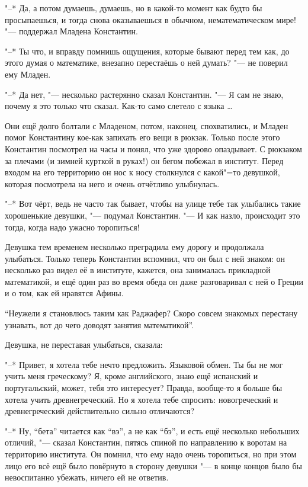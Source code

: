 "--* Да, а потом думаешь, думаешь, но в какой-то момент как будто бы
просыпаешься, и тогда снова оказываешься в обычном, нематематическом мире!
"--- поддержал Младена Константин.

"--* Ты что, и вправду помнишь ощущения, которые бывают перед тем как, до этого
думая о математике, внезапно перестаёшь о ней думать? "--- не поверил ему Младен.

"--* Да нет, "--- несколько растерянно сказал Константин.
"--- Я сам не знаю, почему я это только что сказал.
Как-то само слетело с языка \ldots

Они ещё долго болтали с Младеном, потом, наконец, спохватились, и Младен помог
Константину кое-как запихать его вещи в рюкзак.
Только после этого Константин посмотрел на часы и понял, что уже здорово
опаздывает.
С рюкзаком за плечами (и зимней курткой в руках!) он бегом побежал в институт.
Перед входом на его территорию он нос к носу столкнулся с какой"=то девушкой,
которая посмотрела на него и очень отчётливо улыбнулась.

"--* Вот чёрт, ведь не часто так бывает, чтобы на улице тебе так улыбались
такие хорошенькие девушки, "--- подумал Константин.
"--- И как назло, происходит это тогда, когда надо ужасно торопиться!

Девушка тем временем несколько преградила ему дорогу и продолжала улыбаться.
Только теперь Константин вспомнил, что он был с ней знаком: он несколько раз
видел её в институте, кажется, она занималась прикладной математикой, и ещё один
раз во время обеда он даже разговаривал с ней о Греции и о том, как ей нравятся
Афины.

\enquote{Неужели я становлюсь таким как Раджафер?
Скоро совсем знакомых перестану узнавать, вот до чего доводят занятия
математикой}.

Девушка, не переставая улыбаться, сказала:

"--* Привет, я хотела тебе нечто предложить.
Языковой обмен.
Ты бы не мог учить меня греческому?
Я, кроме английского, знаю ещё испанский и португальский, может, тебя это
интересует?
Правда, вообще-то я больше бы хотела учить древнегреческий.
Но я хотела тебе спросить: новогреческий и древнегреческий действительно сильно
отличаются?

"--* Ну, \enquote{бета} читается как \enquote{вэ}, а не как \enquote{бэ}, и есть
ещё несколько небольших отличий, "--- сказал Константин, пятясь спиной по
направлению к воротам на территорию института.
Он помнил, что ему надо очень торопиться, но при этом лицо его всё ещё было
повёрнуто в сторону девушки "--- в конце концов было бы невоспитанно убежать,
ничего ей не ответив.

